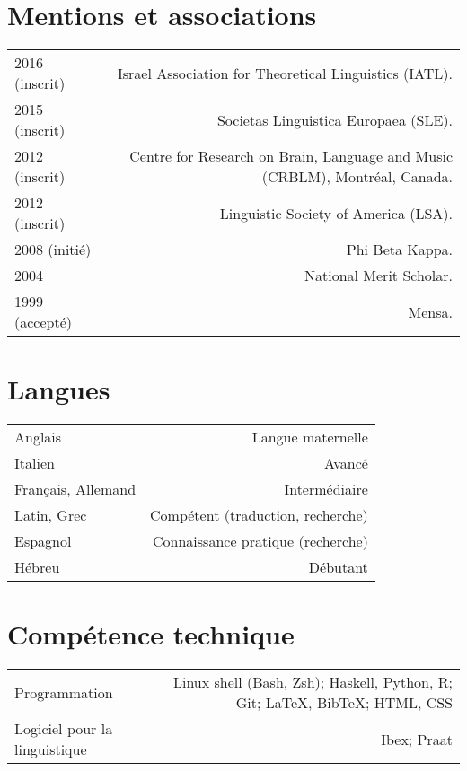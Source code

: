 \documentclass[11pt,a4paper,twoside,french]{article}
\makeatletter
\newenvironment{cvsection}{%
  \setlength{\extrarowheight}{0.70ex}
  \begin{longtable}[l]{@{} L R @{}}
}{%
  \end{longtable}
}
\makeatother
\begin{document}
\section*{Mentions et associations}

\begin{cvsection}
  2016 {\footnotesize (inscrit)} & Israel Association for Theoretical Linguistics (IATL).\\
  2015 {\footnotesize (inscrit)} & Societas Linguistica Europaea (SLE).\\
  2012 {\footnotesize (inscrit)} & Centre for Research on Brain, Language and Music (CRBLM), Montr\'{e}al, Canada.\\
  2012 {\footnotesize (inscrit)} & Linguistic Society of America (LSA).\\
  2008 {\footnotesize (initié)} & Phi Beta Kappa.\\
  2004 & National Merit Scholar.\\
  1999 {\footnotesize (accepté)} & Mensa.\\
\end{cvsection}

\section*{Langues}

\begin{cvsection}
  Anglais & Langue maternelle\\
  Italien & Avancé\\
  Français, Allemand & Intermédiaire\\
  Latin, Grec & Compétent (traduction, recherche)\\
  Espagnol & Connaissance pratique (recherche)\\
  Hébreu & Débutant\\
\end{cvsection}

\section*{Compétence technique}

\begin{cvsection}
  Programmation & Linux shell (Bash, Zsh); Haskell, Python, R; Git; \LaTeX, Bib\TeX; HTML, CSS\\
  Logiciel pour la linguistique & Ibex; Praat\\
\end{cvsection}
\end{document}
